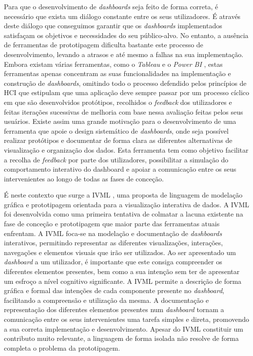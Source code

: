 Para que o desenvolvimento de \textit{dashboards} seja feito de forma correta, é necessário que exista um diálogo constante entre os seus utilizadores. É através deste diálogo que conseguimos garantir que os \textit{dashboards} implementados satisfaçam os objetivos e necessidades do seu público-alvo. No entanto, a ausência de ferramentas de prototipagem dificulta bastante este processo de desenvolvimento, levando a atrasos e até mesmo a falhas na sua implementação. Embora existam várias ferramentas, como o \textit{Tableau} \cite{tableau} e o \textit{Power BI} \cite{powerBI}, estas ferramentas apenas concentram as suas funcionalidades na implementação e construção de \textit{dashboards}, omitindo todo o processo defendido pelos princípios de \gls{HCI} que estipulam que uma aplicação deve sempre passar por um processo cíclico em que são desenvolvidos protótipos, recolhidos o \textit{feedback} dos utilizadores e feitas iterações sucessivas de melhoria com base nessa avaliação feitas pelos seus usuários. Existe assim uma grande motivação para o desenvolvimento de uma ferramenta que apoie o design sistemático de \textit{dashboards}, onde seja possível realizar protótipos e documentar de forma clara as diferentes alternativas de visualização e organização dos dados. Esta ferramenta tem como objetivo facilitar a recolha de \textit{feedback} por parte dos utilizadores, possibilitar a simulação do comportamento interativo do dashboard e apoiar a comunicação entre os seus intervenientes ao longo de todas as fases de conceção.

É neste contexto que surge a \gls{IVML} \cite{Ferreira2023IVML}, uma proposta de linguagem de modelação gráfica e prototipagem orientada para a visualização interativa de dados. A \gls{IVML} foi desenvolvida como uma primeira tentativa de colmatar a lacuna existente na fase de conceção e prototipagem que maior parte das ferramentas atuais enfrentam. A \gls{IVML} foca-se na modelação e documentação de \textit{dashboards} interativos, permitindo representar as diferentes visualizações, interações, navegações e elementos visuais que irão ser utilizados. Ao ser apresentado um \textit{dashboard} a um utilizador, é importante que este consiga compreender os diferentes elementos presentes, bem como a sua intenção sem ter de apresentar um esfroço a nível cognitivo significante. A \gls{IVML} permite a descrição de forma gráfica e formal das intenções de cada componente presente no \textit{dashboard}, facilitando a compreensão e utilização da mesma. A documentação e representação dos diferentes elementos presentes num \textit{dashboard} tornam a comunicação entre os seus intervenientes uma tarefa simples e direta, promovendo a sua correta implementação e desenvolvimento. Apesar do \gls{IVML} constituir um contributo muito relevante, a linguagem de forma isolada não resolve de forma completa o problema da prototipagem.

